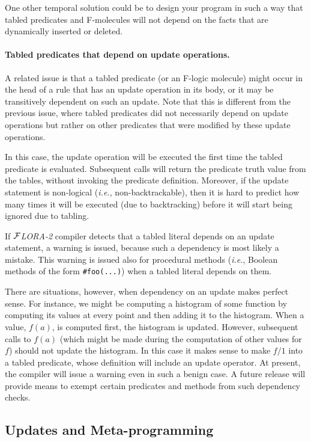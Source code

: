 \documentclass[11pt]{article}
\newcommand{\FLORA}{{\mbox{${\cal F}${\small\it LORA}\rm\emph{-2}}}\xspace}
\begin{document}
One other temporal solution could be to design your program in such a way
that tabled predicates and F-molecules will not depend on the facts that
are dynamically inserted or deleted.

\paragraph{Tabled predicates that depend on update operations.}
A related issue is that a tabled predicate (or an F-logic molecule)
might occur in the head of a rule that has an update operation in its body,
or it may be transitively dependent on such an update. Note that this is
different from the previous issue, where tabled predicates did not
necessarily depend on update operations but rather on other predicates that
were modified by these update operations.

In this case, the update operation will be executed the first time the
tabled predicate is evaluated. Subsequent calls will return the predicate truth
value from the tables, without invoking the predicate definition.
Moreover, if the update statement is non-logical ({\it i.e.},
non-backtrackable), then it is hard to predict how many times it will be
executed (due to backtracking) before it will start being ignored due to
tabling.

If \FLORA compiler detects that a tabled literal depends on an update
statement, a warning is issued, because such a dependency is most likely a
mistake. This warning is issued also for procedural methods ({\it i.e.},
Boolean methods of the form {\tt \#foo(...)}) when a tabled literal depends
on them.

There are situations, however, when dependency on an update makes perfect
sense. For instance, we might be computing a histogram of some function
by computing its values at every point and then adding it to the
histogram. When a value, $f(a)$, is computed first, the histogram is
updated. However, subsequent calls to $f(a)$ (which might be made during
the computation of other values for $f$) should not update the histogram.
In this case it makes sense to make $f/1$ into a tabled predicate, whose
definition will include an update operator. At present, the compiler will
issue a warning even in such a benign case. A future release will provide
means to exempt certain predicates and methods from such dependency checks.


\subsection{Updates and Meta-programming}
\end{document}
